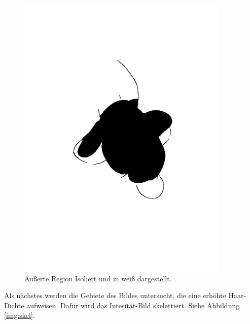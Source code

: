 \documentclass[german,a4paper,12pt]{llncs}
\begin{document}
\begin{figure}
	\centering
	\includegraphics[width=0.9\textwidth]{fig64/08outer section.png}
	\caption[]{Äußerte Region Isoliert und in weiß dargestellt.}
	\label{img:outerSection}
\end{figure}  

Als nächstes werden die Gebiete des Bildes untersucht, die eine erhöhte Haar-Dichte aufweisen.
Dafür wird das Intesität-Bild skelettiert. Siehe Abbildung \ref{img:skel}.
\end{document}

